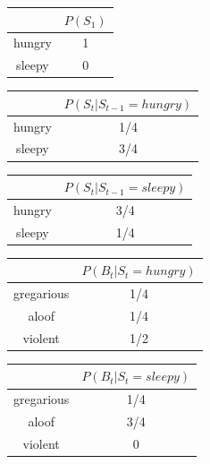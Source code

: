 \documentclass[]{article}
\begin{document}
\begin{table}[!htb]
\centering
    \begin{tabular}{|c|c|}
        \hline
         & $P(S_1)$ \\\hline
         hungry & 1 \\\hline
         sleepy & 0 \\\hline
    \end{tabular}
\end{table}
\begin{table}[!htb]
\centering
    \begin{tabular}{|c|c|}
        \hline
         & $P(S_t|S_{t-1}=hungry)$ \\\hline
         hungry & 1/4 \\\hline
         sleepy & 3/4 \\\hline
    \end{tabular}
\end{table}
\begin{table}[!htb]
\centering
    \begin{tabular}{|c|c|}
        \hline
         & $P(S_t|S_{t-1}=sleepy)$ \\\hline
         hungry & 3/4 \\\hline
         sleepy & 1/4 \\\hline
    \end{tabular}
\end{table}
\begin{table}[!htb]
\centering
    \begin{tabular}{|c|c|}
        \hline
         & $P(B_t|S_t=hungry)$ \\\hline
         gregarious & 1/4 \\\hline
         aloof & 1/4 \\\hline
         violent & 1/2 \\\hline
    \end{tabular}
\end{table}
\begin{table}[!htb]
\centering
    \begin{tabular}{|c|c|}
        \hline
         & $P(B_t|S_t=sleepy)$ \\\hline
         gregarious & 1/4 \\\hline
         aloof & 3/4 \\\hline
         violent & 0 \\\hline
    \end{tabular}
\end{table}
\end{document}

